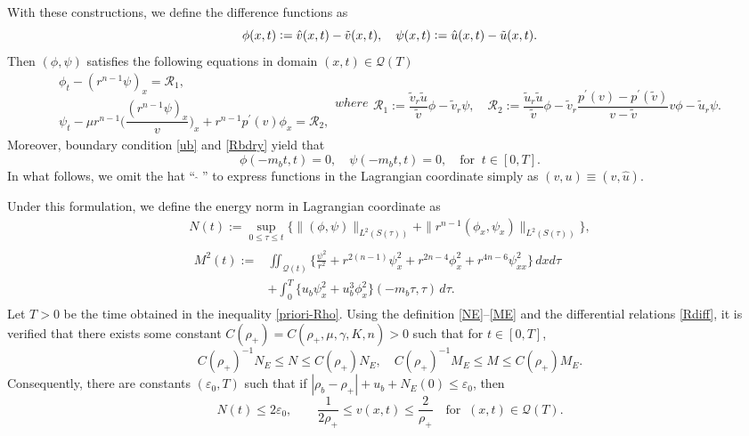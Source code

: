\documentclass[a4paper,12pt,draft]{article}
\theoremstyle{remark}
\def\ut{\tilde{u}}
\def\vt{\tilde{v}}
\def\ep{\varepsilon}
\def\hv{\hat{v}}
\def\hu{\hat{u}}
\def\mQ{\mathcal{Q}}
\def\mR{\mathcal{R}}
\newcommand{\qu}{\quad}
\begin{document}
With these constructions, we define the difference functions as 
\begin{equation*}
	\phi(x,t)\vcentcolon= \hv(x,t)-\vt(x,t), \qu \psi(x,t)\vcentcolon= \hu(x,t)-\ut(x,t).
\end{equation*}
Then $(\phi,\psi)$ satisfies the following equations in domain $(x,t)\in \mQ(T)$
\begin{subequations}\label{dLag}
    \begin{gather}
        \phi_t - (r^{n-1}\psi)_x = \mR_1,\label{dLag-1} \\
        \psi_t - \mu r^{n-1}\Big(\dfrac{(r^{n-1}\psi)_x}{v}\Big)_x + r^{n-1} p^{\prime}(v) \phi_x = \mR_2,\label{dLag-2}
    \end{gather}
    where
    \begin{gather}
    	\mR_1 := \dfrac{\vt_r \ut}{\vt} \phi - \vt_r \psi, \qu \mR_2 := \dfrac{\ut_r \ut}{\vt} \phi - \vt_r \dfrac{p^{\prime}(v)-p^{\prime}(\vt)}{v-\vt} v \phi - \ut_r \psi.
    \end{gather}
\end{subequations}
Moreover, boundary condition \eqref{ub} and \eqref{Rbdry} yield that
\begin{equation}\label{ldbc}
	\phi(-m_b t,t)=0, \qu \psi(-m_b t,t)=0, \qu \text{for } \ t\in[0,T].
\end{equation}
In what follows, we omit the hat ``\,$\hat{ \ }$\,'' to express 
functions in the Lagrangian coordinate simply as $(v,u)\equiv (\hv,\hu)$.

Under this formulation, we define the energy norm in Lagrangian coordinate as
\begin{gather}
    N(t) := \sup\limits_{0\le \tau \le t} \big\{ \| (\phi,\psi) \|_{L^{2}(S(\tau))} + \| r^{n-1} (\phi_x, \psi_x) \|_{L^{2}(S(\tau))} \big\},\label{Nt}\\
    \begin{aligned}
        M^2(t) :=& \iint_{\mQ(t)} \Big\{ \frac{\psi^2}{r^2} + r^{2(n-1)} \psi_x^2 + r^{2n-4} \phi_x^2 + r^{4n-6} \psi_{xx}^2 \Big\} \,dx d\tau \\
        &+ \int_{0}^{T} \big\{ u_b \psi_x^2 + u_b^3 \phi_x^2 \big\}(-m_b \tau, \tau) \, d\tau. 
    \end{aligned}\label{Mt}
\end{gather}
Let $T>0$ be the time obtained in the inequality \eqref{priori-Rho}. Using the definition \eqref{NE}--\eqref{ME} and the differential relations \eqref{Rdiff}, it is verified that there exists some constant $C(\rho_+)=C(\rho_+,\mu,\gamma,K,n)>0$ such that for $t\in[0,T]$,
\begin{equation} \label{NEL}
    C(\rho_{+})^{-1} N_{E} \le N \le C(\rho_{+}) N_{E}, \qu C(\rho_{+})^{-1} M_{E}  \le M \le C(\rho_{+}) M_{E}.
\end{equation}
Consequently, there are constants $(\ep_0,T)$ such that if $|\rho_b-\rho_+|+u_b + N_{E}(0) \le \ep_0$, then 
\begin{equation}\label{priori-Lag}
    N(t)\le 2\ep_0, \qquad \frac{1}{2\rho_{+}} \le v(x,t) \le \dfrac{2}{\rho_+} \quad \text{for } \ (x,t)\in \mQ(T).
\end{equation}
\end{document}
